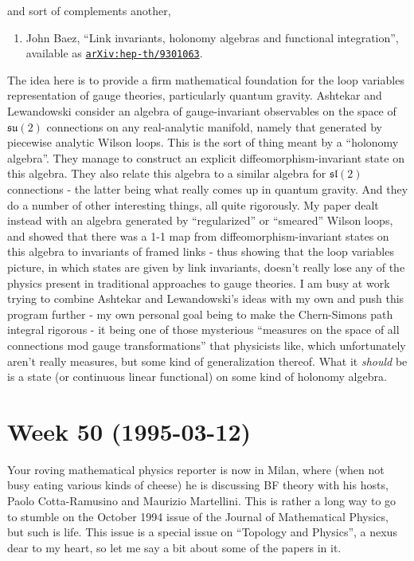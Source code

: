 \documentclass{article}
\def\tightlist{}
\begin{document}
and sort of complements another,

\begin{enumerate}
\def\labelenumi{\arabic{enumi})}
\setcounter{enumi}{5}
\tightlist
\item
  John Baez, ``Link invariants, holonomy algebras and functional
  integration'', available as
  \href{http://arxiv.org/hep-th/9301063}{\texttt{arXiv:hep-th/9301063}}.
\end{enumerate}

The idea here is to provide a firm mathematical foundation for the loop
variables representation of gauge theories, particularly quantum
gravity. Ashtekar and Lewandowski consider an algebra of gauge-invariant
observables on the space of \(\mathfrak{su}(2)\) connections on any
real-analytic manifold, namely that generated by piecewise analytic
Wilson loops. This is the sort of thing meant by a ``holonomy algebra''.
They manage to construct an explicit diffeomorphism-invariant state on
this algebra. They also relate this algebra to a similar algebra for
\(\mathfrak{sl}(2)\) connections - the latter being what really comes up
in quantum gravity. And they do a number of other interesting things,
all quite rigorously. My paper dealt instead with an algebra generated
by ``regularized'' or ``smeared'' Wilson loops, and showed that there
was a 1-1 map from diffeomorphism-invariant states on this algebra to
invariants of framed links - thus showing that the loop variables
picture, in which states are given by link invariants, doesn't really
lose any of the physics present in traditional approaches to gauge
theories. I am busy at work trying to combine Ashtekar and Lewandowski's
ideas with my own and push this program further - my own personal goal
being to make the Chern-Simons path integral rigorous - it being one of
those mysterious ``measures on the space of all connections mod gauge
transformations'' that physicists like, which unfortunately aren't
really measures, but some kind of generalization thereof. What it
\emph{should} be is a state (or continuous linear functional) on some
kind of holonomy algebra.
\hypertarget{week-50-1995-03-12}{%
\section{Week 50 (1995-03-12)}\label{week-50-1995-03-12}}

Your roving mathematical physics reporter is now in Milan, where (when
not busy eating various kinds of cheese) he is discussing BF theory with
his hosts, Paolo Cotta-Ramusino and Maurizio Martellini. This is rather
a long way to go to stumble on the October 1994 issue of the Journal of
Mathematical Physics, but such is life. This issue is a special issue on
``Topology and Physics'', a nexus dear to my heart, so let me say a bit
about some of the papers in it.
\end{document}
